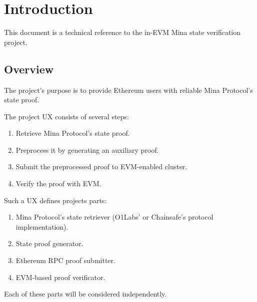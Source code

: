 \chapter{Introduction}

This document is a technical reference to the in-EVM Mina state verification project.

\section{Overview}

The project's purpose is to provide Ethereum users with reliable Mina Protocol's state proof.

The project UX consists of several steps:
\begin{enumerate}
    \item Retrieve Mina Protocol's state proof.
    \item Preprocess it by generating an auxiliary proof.
    \item Submit the preprocessed proof to EVM-enabled cluster.
    \item Verify the proof with EVM.
\end{enumerate}

Such a UX defines projects parts:
\begin{enumerate}
    \item Mina Protocol's state retriever (O1Labs' or Chainsafe's protocol implementation).
    \item State proof generator.
    \item Ethereum RPC proof submitter.
    \item EVM-based proof verificator.
\end{enumerate}

Each of these parts will be considered independently.
